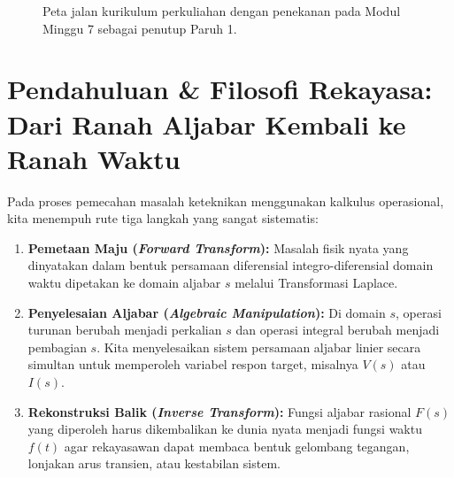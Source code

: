 \documentclass[11pt,a4paper]{article}
\theoremstyle{definition}
\begin{document}
\begin{figure}[htbp]
{%
}
\caption{Peta jalan kurikulum perkuliahan dengan penekanan pada Modul Minggu 7 sebagai penutup Paruh 1.}
\label{fig:peta_jalan_pd_w7}
\end{figure}

\section{Pendahuluan \& Filosofi Rekayasa: Dari Ranah Aljabar Kembali ke Ranah Waktu}

Pada proses pemecahan masalah keteknikan menggunakan kalkulus operasional, kita menempuh rute tiga langkah yang sangat sistematis:
\begin{enumerate}[leftmargin=*]
    \item \textbf{Pemetaan Maju (\textit{Forward Transform}):} Masalah fisik nyata yang dinyatakan dalam bentuk persamaan diferensial integro-diferensial domain waktu dipetakan ke domain aljabar $s$ melalui Transformasi Laplace.
    \item \textbf{Penyelesaian Aljabar (\textit{Algebraic Manipulation}):} Di domain $s$, operasi turunan berubah menjadi perkalian $s$ dan operasi integral berubah menjadi pembagian $s$. Kita menyelesaikan sistem persamaan aljabar linier secara simultan untuk memperoleh variabel respon target, misalnya $V(s)$ atau $I(s)$.
    \item \textbf{Rekonstruksi Balik (\textit{Inverse Transform}):} Fungsi aljabar rasional $F(s)$ yang diperoleh harus dikembalikan ke dunia nyata menjadi fungsi waktu $f(t)$ agar rekayasawan dapat membaca bentuk gelombang tegangan, lonjakan arus transien, atau kestabilan sistem.
\end{enumerate}
\end{document}
